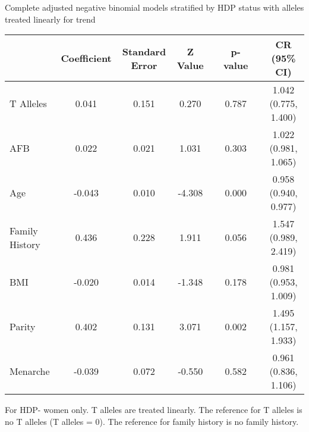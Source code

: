 \documentclass{standalone}
\begin{document}
\begin{threeparttable}
\caption{Complete adjusted negative binomial models stratified by HDP status with alleles treated linearly for trend}
\begin{tabular}{@{}lccccccc@{}}
  \toprule
 & Coefficient & Standard Error & Z Value & \hspace{1em} & p-value & \hspace{1em} & CR (95\% CI) \\ 
  \midrule
  T Alleles\phantom{abcdefghijklm} & 0.041 & 0.151 & 0.270 && 0.787 && 1.042 (0.775, 1.400) \\ 
  AFB & 0.022 & 0.021 & 1.031 && 0.303 && 1.022 (0.981, 1.065) \\ 
  Age & -0.043 & 0.010 & -4.308 && 0.000 && 0.958 (0.940, 0.977) \\ 
  Family History & 0.436 & 0.228 & 1.911 && 0.056 && 1.547 (0.989, 2.419) \\ 
  BMI & -0.020 & 0.014 & -1.348 && 0.178 && 0.981 (0.953, 1.009) \\ 
  Parity & 0.402 & 0.131 & 3.071 && 0.002 && 1.495 (1.157, 1.933) \\ 
  Menarche & -0.039 & 0.072 & -0.550 && 0.582 && 0.961 (0.836, 1.106) \\
   \bottomrule
\end{tabular}
\begin{tablenotes}
\small
\item For HDP- women only. T alleles are treated linearly. The reference for T alleles is no T alleles (T alleles = 0). The reference for family history is no family history.
\end{tablenotes}
\end{threeparttable}
\end{document}
